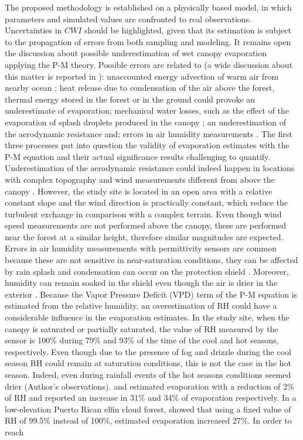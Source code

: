 \documentclass[a4paper,12pt]{article}
\begin{document}
\begin{linenumbers}
The proposed methodology is established on a physically based model, in which parameters and simulated values are confronted to real observations. Uncertainties in $CWI$ should be highlighted, given that its estimation is subject to the propagation of errors from both sampling and modeling. It remains open the discussion about possible underestimation of wet canopy evaporation applying the P-M theory. Possible errors are related to (a wide discussion about this matter is reported in \cite{vanDijketal2015}): unaccounted energy advection of warm air from nearby ocean \citep{Shuttleworth1979, Schellekensetal1999, Holwerdaetal2010}; heat release due to condensation of the air above the forest, thermal energy stored in the forest or in the ground \citep{Scatena1990, Schellekensetal1999, VanDijketal2001, vanDijketal2015} could provoke an underestimate of evaporation; mechanical water losses, such as the effect of the evaporation of splash droplets produced in the canopy \citep{Murakami2007, Dunkerley2009}; an underestimation of the aerodynamic resistance \citep{Holwerdaetal2012} and; errors in air humidity measurements \citep{Frumauetal2006, Holwerdaetal2010, Pryetetal2012a}. The first three processes put into question the validity of evaporation estimates with the P-M equation and their actual significance results challenging to quantify. Underestimation of the aerodynamic resistance could indeed happen in locations with complex topography and wind measurements different from above the canopy \citep{Holwerdaetal2012}. However, the study site is located in an open area with a relative constant slope and the wind direction is practically constant, which reduce the turbulent exchange in comparison with a complex terrain. Even though wind speed measurements are not performed above the canopy, these are performed near the forest at a similar height, therefore similar magnitudes are expected. Errors in air humidity measurements with permittivity sensors are common because these are not sensitive in near-saturation conditions, they can be affected by rain splash and condensation can occur on the protection shield \citep{vanDijketal2015}. Moreover, humidity can remain soaked in the shield even though the air is drier in the exterior \citep{Pryetetal2012a}. Because the Vapor Pressure Deficit (VPD) term of the P-M equation is estimated from the relative humidity, an overestimation of RH could have a considerable influence in the evaporation estimates. In the study site, when the canopy is saturated or partially saturated, the value of RH measured by the sensor is 100\% during 79\% and 93\% of the time of the cool and hot seasons, respectively. Even though due to the presence of fog and drizzle during the cool season RH could remain at saturation conditions, this is not the case in the hot season. Indeed, even during rainfall events of the hot seasons conditions seemed drier (Author's observations). \cite{WallaceandMcJannet2008} and \cite{vanDijketal2015} estimated evaporation with a reduction of 2\% of RH and reported an increase in 31\% and 34\% of evaporation respectively. In a low-elevation Puerto Rican elfin cloud forest,\cite{Holwerdaetal2006} showed that using a fixed value of RH of 99.5\% instead of 100\%, estimated evaporation increased 27\%. In order to reach 
\end{linenumbers}
\end{document}
